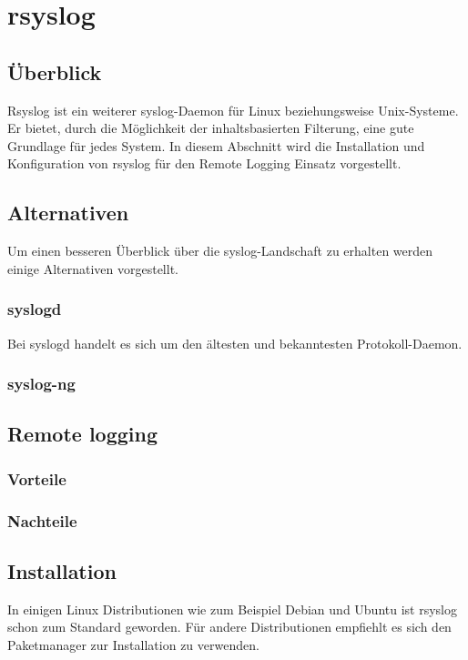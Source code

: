 \section{rsyslog}
	\subsection{Überblick}
		Rsyslog ist ein weiterer syslog-Daemon für Linux beziehungsweise Unix-Systeme. Er bietet, durch 
		die Möglichkeit der inhaltsbasierten Filterung, eine gute Grundlage für jedes System.
		In diesem Abschnitt wird die Installation und Konfiguration von rsyslog für den Remote Logging
		Einsatz vorgestellt.


	\subsection{Alternativen}
		Um einen besseren Überblick über die syslog-Landschaft zu erhalten werden einige Alternativen vorgestellt.
		\subsubsection*{syslogd}
		Bei syslogd handelt es sich um den ältesten und bekanntesten Protokoll-Daemon.\cite{GentooProtokollierung}
		\subsubsection*{syslog-ng}
	\subsection{Remote logging}
		\subsubsection*{Vorteile}
		\subsubsection*{Nachteile}
	\subsection{Installation}
		In einigen Linux Distributionen wie zum Beispiel Debian und Ubuntu ist rsyslog schon zum Standard 
		geworden. Für andere Distributionen empfiehlt es sich den Paketmanager zur Installation zu verwenden.

